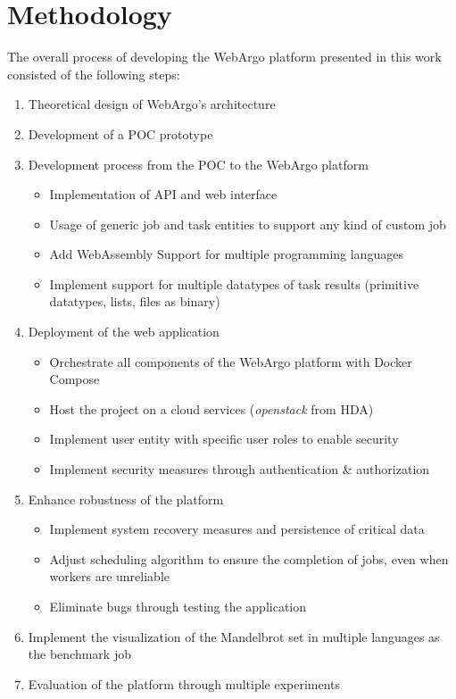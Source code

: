 \chapter{Methodology}
\label{ch:methodology}
The overall process of developing the WebArgo platform presented in this work consisted of the following steps:
\begin{enumerate}
  \item Theoretical design of WebArgo's architecture
  \item Development of a \ac{POC} prototype
  \item Development process from the \ac{POC} to the WebArgo platform
  \begin{itemize}
    \item Implementation of \ac{API} and web interface
    \item Usage of generic job and task entities to support any kind of custom job
    \item Add WebAssembly Support for multiple programming languages
    \item Implement support for multiple datatypes of task results (primitive datatypes, lists, files as binary)
  \end{itemize}
  \item Deployment of the web application
  \begin{itemize}
    \item Orchestrate all components of the WebArgo platform with Docker Compose \cite{conclusion:docker}
    \item Host the project on a cloud services (\emph{openstack} from \ac{HDA})
    \item Implement user entity with specific user roles to enable security
    \item Implement security measures through authentication \& authorization
  \end{itemize}
  \item Enhance robustness of the platform
  \begin{itemize}
    \item Implement system recovery measures and persistence of critical data
    \item Adjust scheduling algorithm to ensure the completion of jobs, even when workers are unreliable
    \item Eliminate bugs through testing the application
  \end{itemize}
  \item Implement the visualization of the Mandelbrot set in multiple languages as the benchmark job
  \item Evaluation of the platform through multiple experiments 
\end{enumerate}

